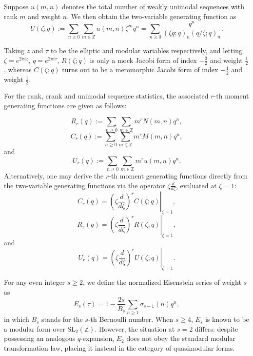 \documentclass[12pt,oneside,reqno]{amsart}
\numberwithin{equation}{section}
\begin{document}
Suppose $u(m,n)$ denotes the total number of weakly unimodal sequences with rank $m$ and weight $n$. We then obtain the two-variable generating function as \cite{KimLovejoy2014}
\begin{equation}\label{eq1.6}
U(\zeta; q) := \sum_{n \geq 0} \sum_{m \in \mathbb{Z}} u(m, n) \zeta^m q^n =
\sum_{n \geq 0} \frac{q^n}{(\zeta q;q)_n (q/\zeta;q)_n}.
\end{equation}

Taking $z$ and $\tau$ to be the elliptic and modular variables
respectively, and letting $\zeta = e^{2\pi i z}$, $q = e^{2\pi i
\tau}$, $R(\zeta;q)$ is only a mock Jacobi form of index $-\tfrac{3}{2}$ and weight $\tfrac{1}{2}$, whereas $C(\zeta;q)$ turns out to be a meromorphic Jacobi form of index $-\tfrac{1}{2}$ and weight $\tfrac{1}{2}$.
 
For the rank, crank and unimodal sequence statistics, the associated
$r$-th moment generating functions are given as follows:

\begin{equation}\label{eq1.8}
	R_r(q):=
	\sum_{n\geq0}\sum_{m\in\mathbb{Z}}
	m^rN(m,n)q^n,
\end{equation}
\begin{equation}\label{eq1.7}
	C_{r}(q):=
	\sum_{n\ge0}\sum_{m\in\mathbb{Z}}
	m^{r}M(m,n)q^{n},
\end{equation}
and
\begin{equation}\label{eq1.9}
	U_r(q):=
	\sum_{n\geq0}\sum_{m\in\mathbb{Z}}
	m^ru(m,n)q^n.
\end{equation}
Alternatively, one may derive the $r$-th moment generating functions
directly from the two-variable generating functions via the operator
$\zeta \frac{d}{d\zeta}$, evaluated at $\zeta = 1$:
\begin{equation}\label{eq1.10}
	C_r(q)=\left.
	\left(\zeta\frac{d}{d\zeta}\right)^r C(\zeta;q)
	\right|_{\zeta=1},
	\end{equation}
\begin{equation}\label{eq1.11}
  R_r(q)=\left.
	\left(\zeta\frac{d}{d\zeta}\right)^r R(\zeta;q)
	\right|_{\zeta=1},
	\end{equation}
and
\begin{equation}\label{eq1.12}
	U_r(q)=\left.
	\left(\zeta\frac{d}{d\zeta}\right)^r
	U(\zeta;q)
	\right|_{\zeta=1}.
\end{equation}

For any even integer $s \geq 2$, we define the normalized Eisenstein
series of weight $s$ as
\[
E_s(\tau)
=
1-\frac{2s}{B_s}
\sum_{n\geq1}\sigma_{s-1}(n)q^n,
\]
in which $B_s$ stands for the $s$-th Bernoulli number. When
$s \geq 4$, $E_s$ is known to be a modular form over
$\mathrm{SL}_2(\mathbb{Z})$. However, the situation at $s=2$ differs:
despite possessing an analogous $q$-expansion, $E_2$ does not obey
the standard modular transformation law, placing it instead in the
category of quasimodular forms.
\end{document}
